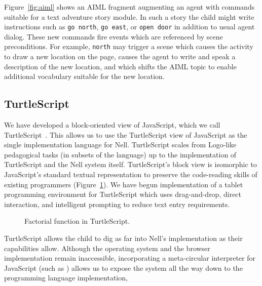 \documentclass[preprint]{sig-alternate}
\begin{document}
Figure~\ref{fig:aiml}
shows an AIML fragment augmenting an agent with
commands suitable for a text adventure story module.
In such a story the child might write instructions such as
\texttt{go north}, \texttt{go east}, or \texttt{open door} in
addition to usual agent dialog.
These new commands fire events which are referenced by scene
preconditions.  For example, \texttt{north} may
trigger a scene which causes the activity to draw a new location on
the page, causes the agent to write and speak a description of the new
location, and which shifts the AIML topic to enable additional vocabulary
suitable for the new location.


\subsection{TurtleScript}\label{sec:turtles}

We have developed a block-oriented view of JavaScript, which we call
TurtleScript~\cite{turtlescript}.  This allows us to use
the TurtleScript view of JavaScript as the single
implementation language for Nell.  TurtleScript scales from Logo-like
pedagogical tasks (in subsets of the language) up to the
implementation of TurtleScript and the
Nell system itself.  TurtleScript's block view is isomorphic to
JavaScript's standard textual
representation to preserve the code-reading skills of existing
programmers (Figure~\ref{fig:turtlescript}).  We have begun implementation of a
tablet programming environment for TurtleScript which uses
drag-and-drop, direct interaction, and intelligent prompting to reduce
text entry requirements.

\begin{figure}
\centering
{}
\caption{Factorial function in TurtleScript.}\label{fig:turtlescript}
\end{figure}

TurtleScript allows the child to dig as far into Nell's implementation
as their capabilities allow.  Although the operating system and the
browser implementation remain inaccessible, incorporating a
meta-circular interpreter for JavaScript (such as \cite{narcissus}) allows us
to expose the system all the way down to the programming
language implementation,
\end{document}
